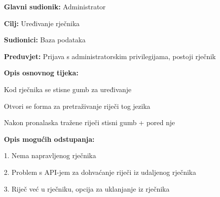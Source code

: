 					\noindent {}
					\begin{packed_item}
						\item \textbf{Glavni sudionik:} Administrator
						\item \textbf{Cilj:} Uređivanje rječnika
						\item \textbf{Sudionici:} Baza podataka
						\item \textbf{Preduvjet:} Prijava s administratorskim privilegijama, postoji rječnik
						\item \textbf{Opis osnovnog tijeka:}
						\begin{packed_enum}
							\item Kod rječnika se stisne gumb za uređivanje
							\item Otvori se forma za pretraživanje riječi tog jezika
							\item Nakon pronalaska tražene riječi stisni gumb + pored nje
						\end{packed_enum}
						\item \textbf{Opis mogućih odstupanja:}
						\begin{packed_item}
							\item 1. Nema napravljenog rječnika
							\item 2. Problem s API-jem za dohvaćanje riječi iz udaljenog rječnika
							\item 3. Riječ već u rječniku, opcija za uklanjanje iz rječnika
						\end{packed_item}
					\end{packed_item}

